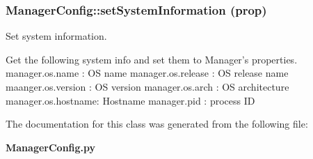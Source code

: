 \subsubsection{\setlength{\rightskip}{0pt plus 5cm}Manager\-Config::set\-System\-Information (prop)}\label{classManagerConfig_ManagerConfiga6}


Set system information. 

Get the following system info and set them to Manager's properties. manager.os.name : OS name manager.os.release : OS release name maanger.os.version : OS version manager.os.arch : OS architecture manager.os.hostname: Hostname manager.pid : process ID

The documentation for this class was generated from the following file:\begin{CompactItemize}
\item 
{\bf Manager\-Config.py}\end{CompactItemize}
